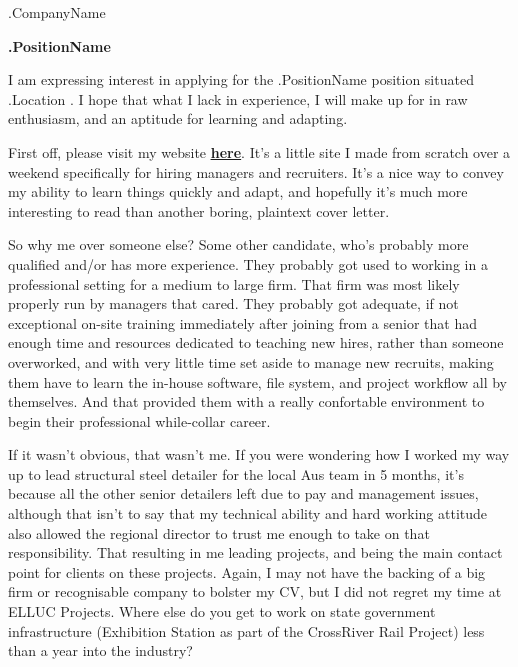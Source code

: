 \documentclass[10pt]{letter}
\begin{document}


\thispagestyle{empty}

\address{Deon Chen \\
    i.am.deon.chen@gmail.com \\ 
    (+61) 0430 342 826
}

\begin{letter}{
    {{ .CompanyName }}
} 

\signature{Deon}

\opening{}

\textbf{
    {{ .PositionName }} 
}

I am expressing interest in applying for the {{ .PositionName }} position situated {{ .Location }}. I hope that what I lack in experience, I will make up for in raw enthusiasm, and an aptitude for learning and adapting. 

First off, please visit my website \underline{\textbf{\href{https://zabuzabuzaza.github.io/home/dear_recruiters/}{here}}}. It's a little site I made from scratch over a weekend specifically for hiring managers and recruiters. It's a nice way to convey my ability to learn things quickly and adapt, and hopefully it's much more interesting to read than another boring, plaintext cover letter. 

So why me over someone else? Some other candidate, who's probably more qualified and/or has more experience. They probably got used to working in a professional setting for a medium to large firm. That firm was most likely properly run by managers that cared. They probably got adequate, if not exceptional on-site training immediately after joining from a senior that had enough time and resources dedicated to teaching new hires, rather than someone overworked, and with very little time set aside to manage new recruits, making them have to learn the in-house software, file system, and project workflow all by themselves. And that provided them with a really confortable environment to begin their professional while-collar career. 

If it wasn't obvious, that wasn't me. If you were wondering how I worked my way up to lead structural steel detailer for the local Aus team in 5 months, it's because all the other senior detailers left due to pay and management issues, although that isn't to say that my technical ability and hard working attitude also allowed the regional director to trust me enough to take on that responsibility. That resulting in me leading projects, and being the main contact point for clients on these projects. Again, I may not have the backing of a big firm or recognisable company to bolster my CV, but I did not regret my time at ELLUC Projects. Where else do you get to work on state government infrastructure (Exhibition Station as part of the CrossRiver Rail Project) less than a year into the industry? 


\end{letter}
\end{document}
